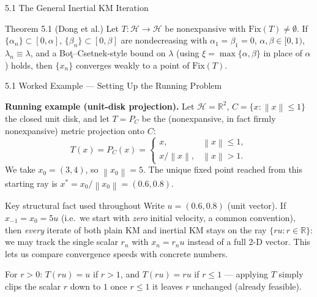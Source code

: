 \documentclass[aspectratio=169,10pt]{beamer}
\newcommand{\mHH}{\mathcal H}
\newcommand{\norm}[1]{\left\|#1\right\|}
\newcommand{\Fix}{\mathrm{Fix}}
\newcommand{\R}{\mathbb{R}}
\begin{document}
\begin{frame}[allowframebreaks]{5.1 The General Inertial KM Iteration}
  \begin{alertblock}{Theorem 5.1 (Dong et al.)}
    Let $T:\mHH\to\mHH$ be nonexpansive with $\Fix(T)\neq\emptyset$.
    If $\{\alpha_n\}\subset[0,\alpha]$, $\{\beta_n\}\subset[0,\beta]$
    are nondecreasing with $\alpha_1=\beta_1=0$,
    $\alpha,\beta\in[0,1)$, $\lambda_n\equiv\lambda$, and a
    Bo\c{t}--Csetnek-style bound on $\lambda$ (using
    $\xi=\max\{\alpha,\beta\}$ in place of $\alpha$) holds, then
    $\{x_n\}$ converges weakly to a point of $\Fix(T)$.
  \end{alertblock}

\end{frame}

\begin{frame}{5.1 Worked Example --- Setting Up the Running Problem}

  \textbf{Running example (unit-disk projection).}  Let
  $\mHH=\R^2$, $C=\{x:\norm{x}\le1\}$ the closed unit disk, and let
  $T=P_C$ be the (nonexpansive, in fact firmly nonexpansive)
  metric projection onto $C$:
  \[
    T(x)=P_C(x)=
    \begin{cases}
      x, & \norm{x}\le1,\\
      x/\norm{x}, & \norm{x}>1.
    \end{cases}
  \]
  We take $x_0=(3,4)$, so $\norm{x_0}=5$.  The unique fixed point
  reached from this starting ray is $x^*=x_0/\norm{x_0}=(0.6,0.8)$.

  \begin{alertblock}{Key structural fact used throughout}
    Write $u=(0.6,0.8)$ (unit vector).  If $x_{-1}=x_0=5u$ (i.e.\
    we start with \emph{zero} initial velocity, a common
    convention), then \emph{every} iterate of both plain KM and
    inertial KM stays on the ray $\{ru : r\in\R\}$: we may track
    the single scalar $r_n$ with $x_n=r_nu$ instead of a full 2-D
    vector. This lets us compare convergence speeds with concrete
    numbers.
  \end{alertblock}

  For $r>0$: $T(ru)=u$ if $r>1$, and $T(ru)=ru$ if $r\le1$ ---
  applying $T$ simply clips the scalar $r$ down to $1$ once
  $r\le 1$ it leaves $r$ unchanged (already feasible).

\end{frame}
\end{document}
